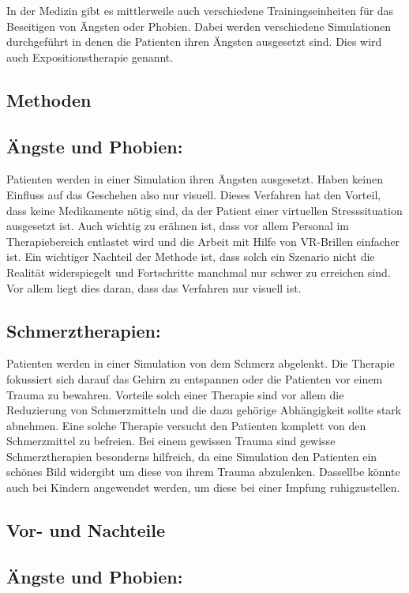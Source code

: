
In der Medizin gibt es mittlerweile auch verschiedene Trainingseinheiten für das Beseitigen von Ängsten oder Phobien. Dabei werden verschiedene Simulationen durchgeführt in denen die Patienten ihren Ängsten ausgesetzt sind. Dies wird auch Expositionstherapie genannt.\\

\subsection{Methoden}
\subsection{Ängste und Phobien:}
Patienten werden in einer Simulation ihren Ängsten ausgesetzt. Haben keinen Einfluss auf das Geschehen also nur visuell. Dieses Verfahren hat den Vorteil, dass keine Medikamente nötig sind, da der Patient einer virtuellen Stresssituation ausgesetzt ist. Auch wichtig zu erähnen ist, dass vor allem Personal im Therapiebereich entlastet wird und die Arbeit mit Hilfe von VR-Brillen einfacher ist. Ein wichtiger Nachteil der Methode ist, dass solch ein Szenario nicht die Realität widerspiegelt und Fortschritte manchmal nur schwer zu erreichen sind. Vor allem liegt dies daran, dass das Verfahren nur visuell ist.\\

\subsection{Schmerztherapien:}
Patienten werden in einer Simulation von dem Schmerz abgelenkt. Die Therapie fokussiert sich darauf das Gehirn zu entspannen oder die Patienten vor einem Trauma zu bewahren. Vorteile solch einer Therapie sind vor allem die Reduzierung von Schmerzmitteln und die dazu gehörige Abhängigkeit sollte stark abnehmen. Eine solche Therapie versucht den Patienten komplett von den Schmerzmittel zu befreien. Bei einem gewissen Trauma sind gewisse Schmerztherapien besonderns hilfreich, da eine Simulation den Patienten ein schönes Bild widergibt um diese von ihrem Trauma abzulenken. Dassellbe könnte auch bei Kindern angewendet werden, um diese bei einer Impfung ruhigzustellen.\\

\subsection{Vor- und Nachteile}
\subsection{Ängste und Phobien:}
